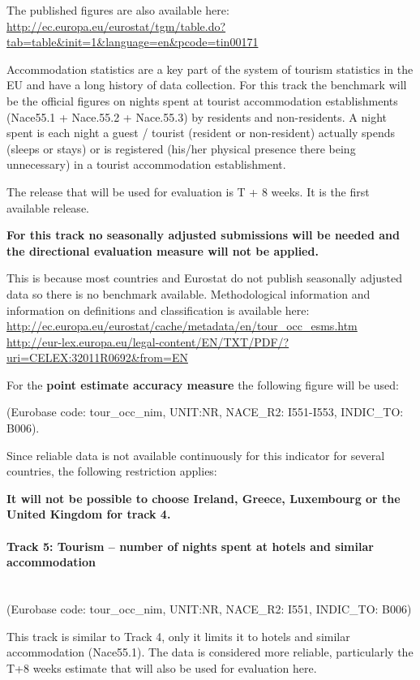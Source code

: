 \documentclass[12pt]{article}
\begin{document}
The published figures are also available here:
\url{http://ec.europa.eu/eurostat/tgm/table.do?tab=table&init=1&language=en&pcode=tin00171}

Accommodation statistics are a key part of the system of tourism statistics in the EU and have a long history of data collection. For this track the benchmark will be the official figures on nights spent at tourist accommodation establishments (Nace55.1 + Nace.55.2 + Nace.55.3) by residents and non-residents. A night spent is each night a guest / tourist (resident or non-resident) actually spends (sleeps or stays) or is registered (his/her physical presence there being unnecessary) in a tourist accommodation establishment. 

The release that will be used for evaluation is T + 8 weeks. It is the first available release. 

\textbf{For this track no seasonally adjusted submissions will be needed and the directional evaluation measure will not be applied.}

This is because most countries and Eurostat do not publish seasonally adjusted data so there is no benchmark available.
Methodological information and information on definitions and classification is available here:
\newline
\url{http://ec.europa.eu/eurostat/cache/metadata/en/tour_occ_esms.htm}
\newline
\url{http://eur-lex.europa.eu/legal-content/EN/TXT/PDF/?uri=CELEX:32011R0692&from=EN}

For the \textbf{point estimate accuracy measure} the following figure will be used:

(Eurobase code: tour\_occ\_nim, UNIT:NR, NACE\_R2: I551-I553, INDIC\_TO: B006).

Since reliable data is not available continuously for this indicator for several countries, the following restriction applies:


\textbf{It will not be possible to choose Ireland, Greece, Luxembourg or the United Kingdom for track 4.}


\paragraph{Track 5: Tourism – number of nights spent at hotels and similar accommodation}
\textbf{ }\\
(Eurobase code: tour\_occ\_nim, UNIT:NR, NACE\_R2: I551, INDIC\_TO: B006)

This track is similar to Track 4, only it limits it to hotels and similar accommodation (Nace55.1). The data is considered more reliable, particularly the T+8 weeks estimate that will also be used for evaluation here.
\end{document}
